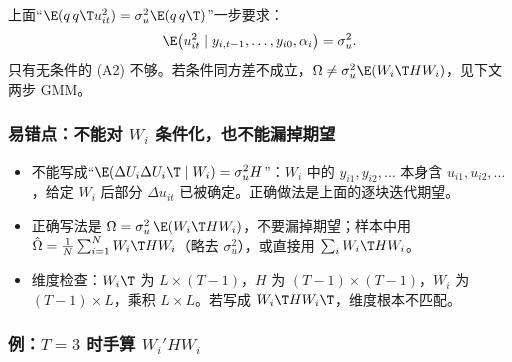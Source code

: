 上面“$\E(q\,q\T u_{it}^2)=\sigma_u^2\E(q\,q\T)$”一步要求：
\[
\E\big(u_{it}^2\mid y_{i,t-1},\dots,y_{i0},\alpha_i\big)=\sigma_u^2 .
\]
只有无条件的 (A2) 不够。若条件同方差不成立，$\Omega\neq\sigma_u^2\E(W_i\T HW_i)$，见下文两步 GMM。

\subsubsection{易错点：不能对 \texorpdfstring{$W_i$}{W\_i} 条件化，也不能漏掉期望}

\begin{note}
\begin{itemize}
  \item 不能写成“$\E(\Delta U_i\Delta U_i\T\mid W_i)=\sigma_u^2H$”：$W_i$ 中的 $y_{i1},y_{i2},\dots$ 本身含 $u_{i1},u_{i2},\dots$，给定 $W_i$ 后部分 $\Delta u_{it}$ 已被确定。正确做法是上面的逐块迭代期望。
  \item 正确写法是 $\Omega=\sigma_u^2\,\E(W_i\T HW_i)$，不要漏掉期望；样本中用 $\hat\Omega=\frac1N\sum_{i=1}^NW_i\T HW_i$（略去 $\sigma_u^2$），或直接用 $\sum_iW_i\T HW_i$。
  \item 维度检查：$W_i\T$ 为 $L\times(T-1)$，$H$ 为 $(T-1)\times(T-1)$，$W_i$ 为 $(T-1)\times L$，乘积 $L\times L$。若写成 $W_i\T HW_i\T$，维度根本不匹配。
\end{itemize}
\end{note}

\subsubsection{例：\texorpdfstring{$T=3$}{T=3} 时手算 \texorpdfstring{$W_i'HW_i$}{W'HW}}

